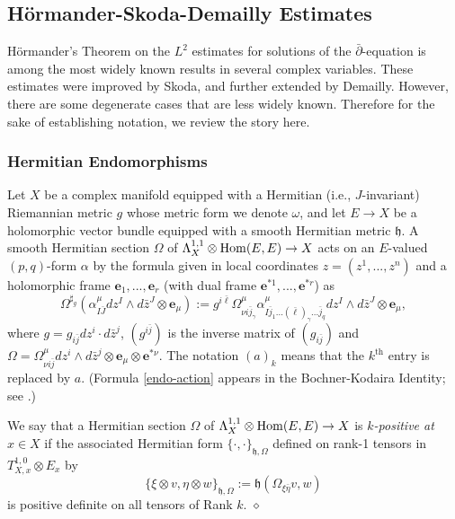 \documentclass[12pt,hidelinks]{amsart}
\newcommand{\fh}{{\mathfrak h}}
\newcommand{\red}{\hfill $\diamond$}
\newcommand{\dbar}{\bar \partial}
\newcommand{\tensor}{\otimes}
\begin{document}
\subsection{H\"ormander-Skoda-Demailly Estimates}\label{hsd-est-par}

H\"ormander's Theorem on the $L^2$ estimates for solutions of the $\dbar$-equation is among the most widely known results in several complex variables.  These estimates were improved by Skoda, and further extended by Demailly.  However, there are some degenerate cases that are less widely known.  Therefore for the sake of establishing notation, we review the story here.

\subsubsection*{\sc Hermitian Endomorphisms}

Let $X$ be a complex manifold equipped with a Hermitian (i.e., $J$-invariant) Riemannian metric $g$ whose metric form we denote $\omega$, and let $E \to X$ be a holomorphic vector bundle equipped with a smooth Hermitian metric $\fh$.  A smooth Hermitian section $\Omega$ of $\Lambda ^{1,1} _X \tensor {\rm Hom}(E,E) \to X$ acts on an $E$-valued $(p,q)$-form $\alpha$ by the formula given in local coordinates $z = (z^1,..., z^n)$ and a holomorphic frame $\mathbf{e}_1, ..., \mathbf{e}_r$ (with dual frame $\mathbf{e}^{*1},...,\mathbf{e}^{*r}$) as
\begin{equation}\label{endo-action}
\Omega ^{\sharp _g} \left ( \alpha ^{\mu} _{I \bar J} dz ^I \wedge d\bar z ^J \tensor \mathbf{e} _{\mu} \right ) := g^{i \bar \ell} \Omega ^{\mu} _{\nu i \bar j_{\gamma} } \alpha^{\mu}  _{I \bar j_1 ... (\bar \ell) _{\gamma} ... \bar j_q} dz^I \wedge d\bar z ^J \tensor \mathbf{e} _{\mu},
\end{equation}
where $g = g_{i \bar j} dz ^i \cdot d\bar z ^j$, $(g^{i\bar j})$ is the inverse matrix of $(g_{i\bar j})$ and $\Omega = \Omega ^{\mu} _{\nu i\bar j} dz ^i \wedge d\bar z ^j \tensor \mathbf{e}_{\mu} \tensor \mathbf{e} ^{*\nu}$.  The notation $(a)_k$ means that the $k^{\text{th}}$ entry is replaced by $a$.  (Formula \eqref{endo-action} appears in the Bochner-Kodaira Identity; see \cite[Page 63]{siu-harmonic}.)

\begin{defn}\label{pos-endos-defn}
We say that a Hermitian section $\Omega$ of $\Lambda ^{1,1} _X \tensor {\rm Hom}(E,E) \to X$ is \emph{$k$-positive at $x \in X$} if the associated Hermitian form $\{ \cdot, \cdot \}_{\fh, \Omega}$ defined on rank-1 tensors in $T^{1,0}_{X,x} \tensor E_x$ by 
\[
\{ \xi \tensor v, \eta \tensor w\}_{\fh, \Omega} := \fh ( \Omega _{\xi \bar \eta} v, w)
\]
is positive definite on all tensors of Rank $k$.
\red
\end{defn}
\end{document}
